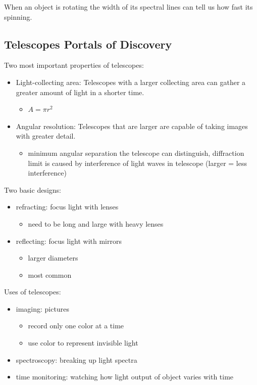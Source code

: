 \documentclass[12pt]{article}
\begin{document}
When an object is rotating the width of its spectral lines can tell us how fast its spinning.

\subsection{Telescopes Portals of Discovery}
Two most important properties of telescopes:
\begin{itemize}
    \item Light-collecting area: Telescopes with a larger collecting area can gather a greater amount of light in a shorter time.
    \begin{itemize}
        \item $A = \pi r^2$
    \end{itemize}
    \item Angular resolution: Telescopes that are larger are capable of taking images with greater detail.
    \begin{itemize}
        \item minimum angular separation the telescope can distinguish, diffraction limit is caused by interference of light waves in telescope (larger = less interference)
    \end{itemize}
\end{itemize}
Two basic designs:
\begin{itemize}
    \item refracting: focus light with lenses
    \begin{itemize}
        \item need to be long and large with heavy lenses
    \end{itemize}
    \item reflecting: focus light with mirrors
    \begin{itemize}
        \item larger diameters
        \item most common
    \end{itemize}
\end{itemize}
Uses of telescopes:
\begin{itemize}
    \item imaging: pictures
    \begin{itemize}
        \item record only one color at a time
        \item use color to represent invisible light
    \end{itemize}
    \item spectroscopy: breaking up light spectra
    \item time monitoring: watching how light output of object varies with time
\end{itemize}
\end{document}
